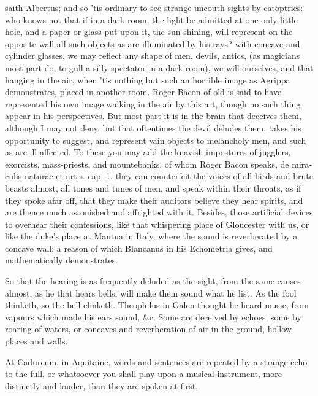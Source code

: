 {saith Albertus; and so 'tis ordinary to see strange uncouth sights by
catoptrics: who knows not that if in a dark room, the light be admitted
at one only little hole, and a paper or glass put upon it, the sun
shining, will represent on the opposite wall all such objects as are
illuminated by his rays? with concave and cylinder glasses, we may
reflect any shape of men, devils, antics, (as magicians most part do,
to gull a silly spectator in a dark room), we will ourselves, and that
hanging in the air, when 'tis nothing but such an horrible image as
Agrippa demonstrates, placed in another room. Roger Bacon of old
is said to have represented his own image walking in the air by this
art, though no such thing appear in his perspectives. But most part it
is in the brain that deceives them, although I may not deny, but that
oftentimes the devil deludes them, takes his opportunity to suggest,
and represent vain objects to melancholy men, and such as are ill
affected. To these you may add the knavish impostures of jugglers,
exorcists, mass-priests, and mountebanks, of whom Roger Bacon speaks,
\etc{} \textlatin{de miraculis naturae et artis. cap. 1.} they can counterfeit
the voices of all birds and brute beasts almost, all tones and tunes of
men, and speak within their throats, as if they spoke afar off, that
they make their auditors believe they hear spirits, and are thence much
astonished and affrighted with it. Besides, those artificial devices to
overhear their confessions, like that whispering place of Gloucester
with us, or like the duke's place at Mantua in Italy, where the
sound is reverberated by a concave wall; a reason of which Blancanus in
his Echometria gives, and mathematically demonstrates.

So that the hearing is as frequently deluded as the sight, from the
same causes almost, as he that hears bells, will make them sound what
he list. As the fool thinketh, so the bell clinketh. Theophilus in
Galen thought he heard music, from vapours which made his ears sound,
\&c. Some are deceived by echoes, some by roaring of waters, or concaves
and reverberation of air in the ground, hollow places and walls.

At Cadurcum, in Aquitaine, words and sentences are repeated by a
strange echo to the full, or whatsoever you shall play upon a musical
instrument, more distinctly and louder, than they are spoken at first.

}
